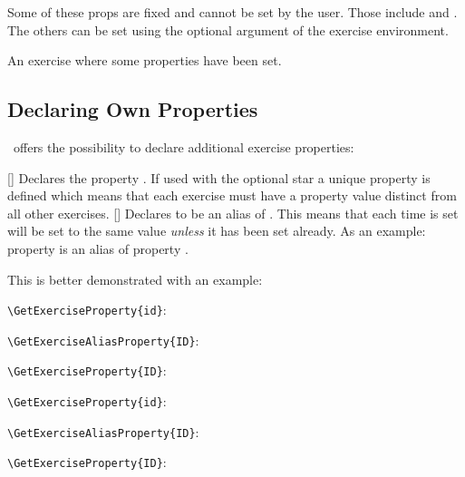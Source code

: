 \documentclass[load-preamble+]{cnltx-doc}
\begin{document}
Some of these \acsp*{prop} are fixed and cannot be set by the user.  Those
include  and .  The others can be set using the
optional argument of the exercise environment.

\begin{example}
  \begin{exercise}[subtitle={This is a subtitle}]
    An exercise where some properties have been set.
  \end{exercise}
\end{example}

\subsection{Declaring Own Properties}

\xsim\ offers the possibility to declare additional exercise properties:
\begin{commands}
  [\sarg{}]
    Declares the property .  If used with the optional star a
    unique property is defined which means that each exercise must have a
    property value distinct from all other exercises.
  []
    Declares  to be an alias of .  This
    means that each time  is set  will be
    set to the same value \emph{unless} it has been set already.  As an
    example: property  is an alias of property .
\end{commands}

This is better demonstrated with an example:
\begin{example}
  \begin{exercise}
    \lipsum[4] %
    \verb+\GetExerciseProperty{id}+:  \par
    \verb+\GetExerciseAliasProperty{ID}+:  \par
    \verb+\GetExerciseProperty{ID}+: 
  \end{exercise}
  \begin{exercise}[ID=foo-bar]
    \lipsum[4]
    \verb+\GetExerciseProperty{id}+:  \par
    \verb+\GetExerciseAliasProperty{ID}+:  \par
    \verb+\GetExerciseProperty{ID}+: 
  \end{exercise}
\end{example}
\end{document}
